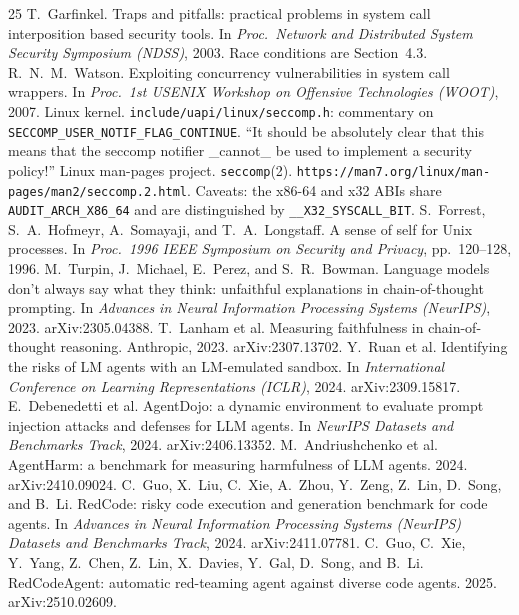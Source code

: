 \documentclass[11pt]{article}
\begin{document}
\begin{thebibliography}{25}
 T.~Garfinkel. Traps and pitfalls: practical problems in system call interposition based security tools. In \emph{Proc.\ Network and Distributed System Security Symposium (NDSS)}, 2003. Race conditions are Section~4.3.
 R.~N.~M.~Watson. Exploiting concurrency vulnerabilities in system call wrappers. In \emph{Proc.\ 1st USENIX Workshop on Offensive Technologies (WOOT)}, 2007.
 Linux kernel. \texttt{include/uapi/linux/seccomp.h}: commentary on \texttt{SECCOMP\_USER\_NOTIF\_FLAG\_CONTINUE}. ``It should be absolutely clear that this means that the seccomp notifier \_cannot\_ be used to implement a security policy!''
 Linux man-pages project. \texttt{seccomp}(2). \texttt{https://man7.org/linux/man-pages/man2/seccomp.2.html}. Caveats: the x86-64 and x32 ABIs share \texttt{AUDIT\_ARCH\_X86\_64} and are distinguished by \texttt{\_\_X32\_SYSCALL\_BIT}.
 S.~Forrest, S.~A.~Hofmeyr, A.~Somayaji, and T.~A.~Longstaff. A sense of self for Unix processes. In \emph{Proc.\ 1996 IEEE Symposium on Security and Privacy}, pp.\ 120--128, 1996.
 M.~Turpin, J.~Michael, E.~Perez, and S.~R.~Bowman. Language models don't always say what they think: unfaithful explanations in chain-of-thought prompting. In \emph{Advances in Neural Information Processing Systems (NeurIPS)}, 2023. arXiv:2305.04388.
 T.~Lanham et al. Measuring faithfulness in chain-of-thought reasoning. Anthropic, 2023. arXiv:2307.13702.
 Y.~Ruan et al. Identifying the risks of LM agents with an LM-emulated sandbox. In \emph{International Conference on Learning Representations (ICLR)}, 2024. arXiv:2309.15817.
 E.~Debenedetti et al. AgentDojo: a dynamic environment to evaluate prompt injection attacks and defenses for LLM agents. In \emph{NeurIPS Datasets and Benchmarks Track}, 2024. arXiv:2406.13352.
 M.~Andriushchenko et al. AgentHarm: a benchmark for measuring harmfulness of LLM agents. 2024. arXiv:2410.09024.
 C.~Guo, X.~Liu, C.~Xie, A.~Zhou, Y.~Zeng, Z.~Lin, D.~Song, and B.~Li. RedCode: risky code execution and generation benchmark for code agents. In \emph{Advances in Neural Information Processing Systems (NeurIPS) Datasets and Benchmarks Track}, 2024. arXiv:2411.07781.
 C.~Guo, C.~Xie, Y.~Yang, Z.~Chen, Z.~Lin, X.~Davies, Y.~Gal, D.~Song, and B.~Li. RedCodeAgent: automatic red-teaming agent against diverse code agents. 2025. arXiv:2510.02609.

\end{thebibliography}
\end{document}
